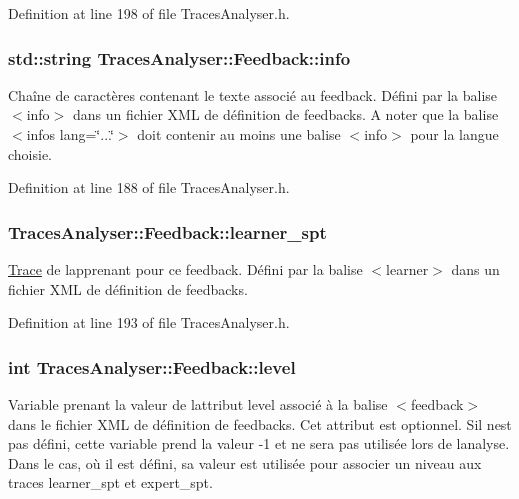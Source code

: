 Definition at line 198 of file Traces\+Analyser.\+h.

\subsubsection[{\texorpdfstring{info}{info}}]{\setlength{\rightskip}{0pt plus 5cm}std\+::string Traces\+Analyser\+::\+Feedback\+::info}\hypertarget{struct_traces_analyser_1_1_feedback_a3300931839b28cbf4a2d1faa3028c679}{}\label{struct_traces_analyser_1_1_feedback_a3300931839b28cbf4a2d1faa3028c679}
Chaîne de caractères contenant le texte associé au feedback. Défini par la balise $<$info$>$ dans un fichier X\+ML de définition de feedbacks. A noter que la balise $<$infos lang=\char`\"{}...\char`\"{}$>$ doit contenir au moins une balise $<$info$>$ pour la langue choisie. 

Definition at line 188 of file Traces\+Analyser.\+h.

\subsubsection[{\texorpdfstring{learner\+\_\+spt}{learner_spt}}]{ Traces\+Analyser\+::\+Feedback\+::learner\+\_\+spt}\hypertarget{struct_traces_analyser_1_1_feedback_a1c4848a6f5ad484386c1baaac8270a27}{}\label{struct_traces_analyser_1_1_feedback_a1c4848a6f5ad484386c1baaac8270a27}
\hyperlink{class_trace}{Trace} de l\textquotesingle{}apprenant pour ce feedback. Défini par la balise $<$learner$>$ dans un fichier X\+ML de définition de feedbacks. 

Definition at line 193 of file Traces\+Analyser.\+h.

\subsubsection[{\texorpdfstring{level}{level}}]{\setlength{\rightskip}{0pt plus 5cm}int Traces\+Analyser\+::\+Feedback\+::level}\hypertarget{struct_traces_analyser_1_1_feedback_a4ec88472bb7b925d548267cb263ee81b}{}\label{struct_traces_analyser_1_1_feedback_a4ec88472bb7b925d548267cb263ee81b}
Variable prenant la valeur de l\textquotesingle{}attribut \textquotesingle{}level\textquotesingle{} associé à la balise $<$feedback$>$ dans le fichier X\+ML de définition de feedbacks. Cet attribut est optionnel. S\textquotesingle{}il n\textquotesingle{}est pas défini, cette variable prend la valeur -\/1 et ne sera pas utilisée lors de l\textquotesingle{}analyse. Dans le cas, où il est défini, sa valeur est utilisée pour associer un niveau aux traces {\ttfamily learner\+\_\+spt} et {\ttfamily expert\+\_\+spt}. 

